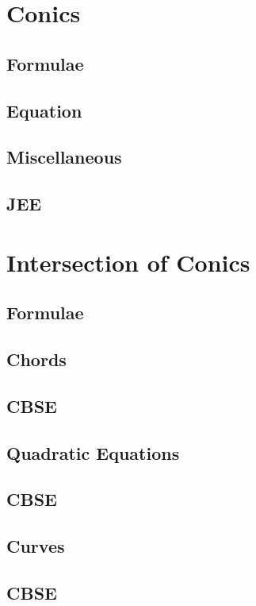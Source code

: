 \documentclass[journal]{IEEEtran}
\begin{document}
\section{Conics}
\subsection{Formulae}

\subsection{Equation}

\subsection{Miscellaneous}

\subsection{JEE}
 
\newpage
\section{Intersection of Conics}
\subsection{Formulae}

\subsection{Chords}

\subsection{CBSE}

\subsection{Quadratic Equations}

\subsection{CBSE}

\subsection{Curves}

\subsection{CBSE}

\end{document}
